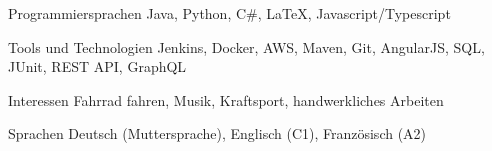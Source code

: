 

\begin{cvskills}


    
  \cvskill
    {Programmiersprachen} %
    {Java, Python, C\#, LaTeX, Javascript/Typescript} %
    
  \cvskill
    {Tools und Technologien} %
    {Jenkins, Docker, AWS, Maven, Git, AngularJS, SQL, JUnit, REST API, GraphQL} %

  \cvskill
    {Interessen} %
    {Fahrrad fahren, Musik, Kraftsport, handwerkliches Arbeiten } %
    
  \cvskill
    {Sprachen} %
    {Deutsch (Muttersprache), Englisch (C1), Französisch (A2)} %

\end{cvskills}
